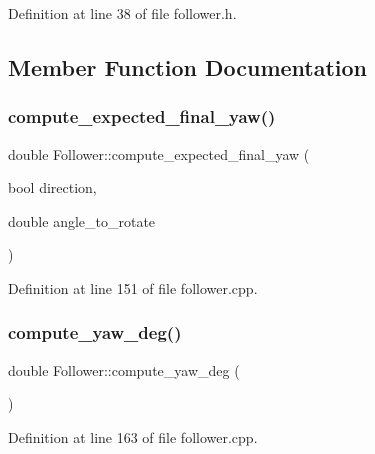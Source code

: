 Definition at line 38 of file follower.\+h.



\subsection{Member Function Documentation}
\mbox{\label{class_follower_a5573bec72ce4aed99706213154849b65}} 
\subsubsection{\texorpdfstring{compute\+\_\+expected\+\_\+final\+\_\+yaw()}{compute\_expected\_final\_yaw()}}
{\footnotesize\ttfamily double Follower\+::compute\+\_\+expected\+\_\+final\+\_\+yaw (\begin{DoxyParamCaption}\item[{bool}]{direction,  }\item[{double}]{angle\+\_\+to\+\_\+rotate }\end{DoxyParamCaption})}



Definition at line 151 of file follower.\+cpp.

\mbox{\label{class_follower_ac988cad87474cb64ef3be7fe197d90a7}} 
\subsubsection{\texorpdfstring{compute\+\_\+yaw\+\_\+deg()}{compute\_yaw\_deg()}}
{\footnotesize\ttfamily double Follower\+::compute\+\_\+yaw\+\_\+deg (\begin{DoxyParamCaption}{ }\end{DoxyParamCaption})}



Definition at line 163 of file follower.\+cpp.

\mbox{\label{class_follower_abde593631e6549062d77fb2169a17c66}} 
